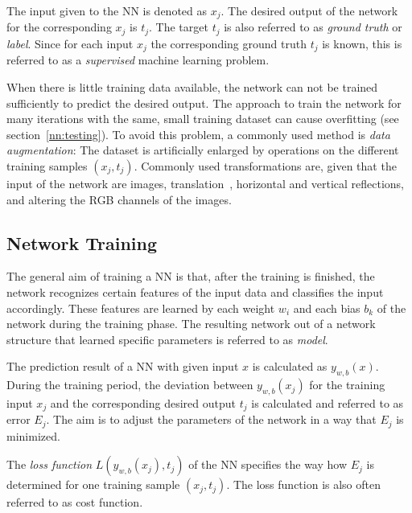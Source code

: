 The input given to the NN is denoted as $x_j$. The desired output of the network for the corresponding $x_j$ is $t_j$. The target $t_j$ is also referred to as \emph{ground truth} or \emph{label}. 
Since for each input $x_j$ the corresponding ground truth $t_j$ is known, this is referred to as a \emph{supervised} machine learning problem.

When there is little training data available, the network can not be trained sufficiently to predict the desired output. %
The approach to train the network for many iterations with the same, small training dataset can cause overfitting (see section~\ref{nn:testing}).
To avoid this problem, a commonly used method is \emph{data augmentation}: The dataset is artificially enlarged by operations on the different training samples $(x_j,t_j)$. Commonly used transformations are, given that the input of the network are images, translation~\cite{augmentation_SAR2016Ding}, horizontal and vertical reflections, and altering the RGB channels of the images.~\cite{imageNetWinner2012krizhevsky}

\subsection{Network Training}
\label{nn:training_methods} %
The general aim of training a NN is that, after the training is finished, the network recognizes certain features of the input data and classifies the input accordingly. These features are learned by each weight $w_i$ and each bias $b_k$ of the network during the training phase.
The resulting network out of a network structure that learned specific parameters is referred to as \emph{model}. 

The prediction result of a NN with given input $x$ is calculated as $y_{w,b}(x)$.
During the training period, the deviation between $y_{w,b}(x_j)$ for the training input $x_j$ and the corresponding desired output $t_j$ is calculated and referred to as error $E_j$.
The aim is to adjust the parameters of the network in a way that $E_j$ is minimized.

The \emph{loss function} $L(y_{w,b}(x_j), t_j)$ of the NN specifies the way how $E_j$ is determined for one training sample $(x_j,t_j)$.
The loss function is also often referred to as cost function. 

